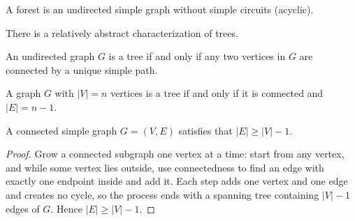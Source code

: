 \begin{definition}[Forests]
A forest is an undirected simple graph without simple circuits (acyclic).
\end{definition}

There is a relatively abstract characterization of trees.

\begin{theorem}
An undirected graph $G$ is a tree if and only if any two vertices in $G$ are connected by a unique simple path.
\end{theorem}

\begin{theorem}
A graph $G$ with $|V|=n$ vertices is a tree if and only if it is connected and $|E|=n-1$.
\end{theorem}

\begin{theorem}[Corollary]
A connected simple graph $G=(V,E)$ satisfies that $|E| \geq |V|-1$.
\end{theorem}

\begin{proof}
Grow a connected subgraph one vertex at a time: start from any vertex, and while some vertex lies outside, use connectedness to find an edge with exactly one endpoint inside and add it. Each step adds one vertex and one edge and creates no cycle, so the process ends with a spanning tree containing $|V|-1$ edges of $G$. Hence $|E| \geq |V|-1$.
\end{proof}

